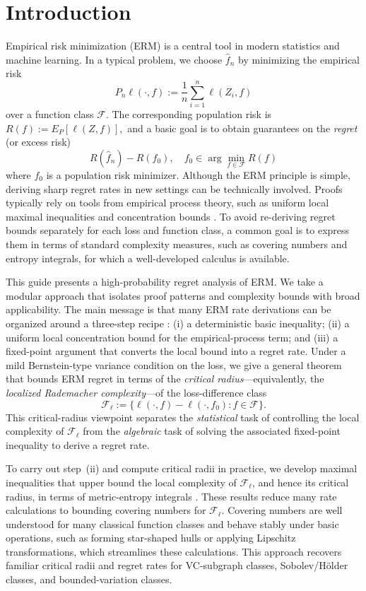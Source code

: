 \documentclass[11pt]{article}
\theoremstyle{plain}
\theoremstyle{definition} %
\begin{document}
 
\section{Introduction}\label{sec:intro}

Empirical risk minimization (ERM) is a central tool in modern statistics and machine learning. In a typical problem, we choose \(\hat f_n\) by minimizing the empirical risk $$P_n \ell(\cdot, f) := \frac{1}{n}\sum_{i=1}^n \ell(Z_i,f)$$
over a function class \(\mathcal F\). The corresponding population risk is $R(f) := E_P[\ell(Z,f)],$
and a basic goal is to obtain guarantees on the \emph{regret} (or excess risk) $$R(\hat f_n)-R(f_0), \quad f_0 \in \arg\min_{f\in\mathcal F} R(f)$$
where $f_0$
is a population risk minimizer. Although the ERM principle is simple, deriving sharp regret rates in new settings can be technically involved. Proofs typically rely on tools from empirical process theory, such as uniform local maximal inequalities and concentration bounds \citep{van1996weak,geer2000empirical,gine2006concentration,wainwright2019high}. To avoid re-deriving regret bounds separately for each loss and function class, a common goal is to express them in terms of standard complexity measures, such as covering numbers and entropy integrals, for which a well-developed calculus is available.

This guide presents a high-probability regret analysis of ERM. We take a modular
approach that isolates proof patterns and complexity bounds with broad
applicability. The main message is that many ERM rate derivations can be
organized around a three-step recipe
\citep{geer2000empirical,abbeel2004apprenticeship,bartlett2005local,koltchinskii2011oracle,wainwright2019high}:
(i) a deterministic basic inequality; (ii) a uniform local concentration bound
for the empirical-process term; and (iii) a fixed-point argument that converts
the local bound into a regret rate. Under a mild Bernstein-type variance
condition on the loss, we give a general theorem that bounds ERM regret in
terms of the \emph{critical radius}---equivalently, the \emph{localized
Rademacher complexity}---of the loss-difference class
\[
\mathcal F_\ell := \{\ell(\cdot,f)-\ell(\cdot,f_0): f\in\mathcal F\}.
\]
This critical-radius viewpoint separates the \emph{statistical} task of
controlling the local complexity of \(\mathcal F_\ell\) from the
\emph{algebraic} task of solving the associated fixed-point inequality to
derive a regret rate.

To carry out step~(ii) and compute critical radii in practice, we develop maximal
inequalities that upper bound the local complexity of \(\mathcal F_\ell\), and hence its
critical radius, in terms of metric-entropy integrals
\citep{van2011local,lei2016local,wainwright2019high}. These results reduce many rate
calculations to bounding covering numbers for \(\mathcal F_\ell\). Covering numbers are
well understood for many classical function classes and behave stably under basic
operations, such as forming star-shaped hulls or applying Lipschitz transformations,
which streamlines these calculations. This approach recovers familiar critical radii
and regret rates for VC-subgraph classes, Sobolev/H\"older classes, and bounded-variation
classes.
\end{document}
